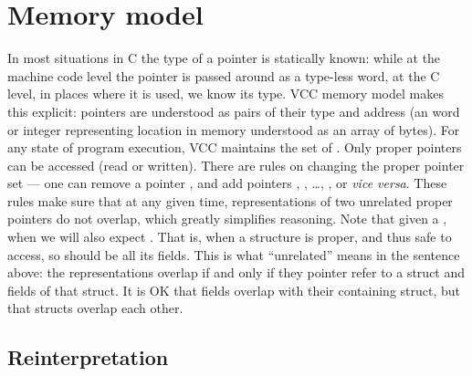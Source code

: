 \section{Memory model}
\label{sect:memmodel}

In most situations in C the type of a pointer is statically known:
while at the machine code level the pointer is passed around as a type-less
word, at the C level, in places where it is used, we know its type.
VCC memory model makes this explicit: pointers are understood as pairs
of their type and address (an word or integer representing location in memory
understood as an array of bytes).
For any state of program execution, VCC maintains the set of .
Only proper pointers can be accessed (read or written).
There are rules on changing the proper pointer set --- \eg one can remove
a pointer , and add pointers , ,
\dots, , or \textit{vice versa}.
These rules make sure that at any given time, representations of two
unrelated proper pointers do not overlap, which greatly simplifies reasoning.
Note that given a , when 
we will also expect .
That is, when a structure is proper, and thus safe to access, so should
be all its fields.
This is what ``unrelated'' means in the sentence above:
the representations overlap if and only if they pointer refer to a struct
and fields of that struct.
It is OK that fields overlap with their containing struct, but that
structs overlap each other.

\subsection{Reinterpretation}
\label{sect:reint}
